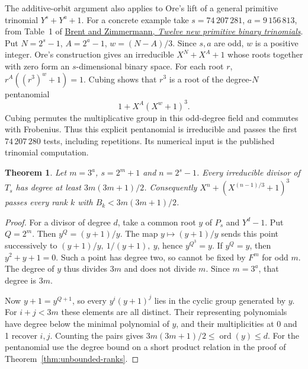 \documentclass[11pt]{article}
\newtheorem{theorem}{Theorem}
\newcommand{\ord}{\operatorname{ord}}
\begin{document}
The additive-orbit argument also applies to Ore's lift of a general
primitive trinomial \(Y^s+Y^a+1\). For a concrete example take
\(s=74\,207\,281\), \(a=9\,156\,813\), from Table~1 of
\href{https://maths-people.anu.edu.au/~brent/pd/rpb266.pdf}
{Brent and Zimmermann, \emph{Twelve new primitive binary trinomials}}.
Put \(N=2^s-1\), \(A=2^a-1\), \(w=(N-A)/3\). Since \(s,a\) are
odd, \(w\) is a positive integer. Ore's construction gives an
irreducible \(X^N+X^A+1\) whose roots together with zero form an
\(s\)-dimensional binary space. For each root \(r\),
\(r^A((r^3)^w+1)=1\). Cubing shows that \(r^3\) is a root of
the degree-\(N\) pentanomial
\[
                         1+X^A(X^w+1)^3.
\]
Cubing permutes the multiplicative group in this odd-degree field and
commutes with Frobenius. Thus this explicit pentanomial is irreducible
and passes the first \(74\,207\,280\) tests, including repetitions.
Its numerical input is the published trinomial computation.

\begin{theorem}\label{thm:factor-growth}
Let \(m=3^a\), \(s=2^m+1\) and \(n=2^s-1\). Every irreducible
divisor of \(T_s\) has degree at least \(3m(3m+1)/2\).
Consequently \(X^n+(X^{(n-1)/3}+1)^3\) passes every rank \(k\)
with \(B_k<3m(3m+1)/2\).
\end{theorem}
\begin{proof}
For a divisor of degree \(d\), take a common root \(y\) of \(P_s\)
and \(Y^d-1\). Put \(Q=2^m\). Then \(y^Q=(y+1)/y\).
The map \(y\mapsto(y+1)/y\) sends this point successively to
\((y+1)/y,\ 1/(y+1),\ y\), hence \(y^{Q^3}=y\).
If \(y^Q=y\), then \(y^2+y+1=0\). Such a point has degree two,
so cannot be fixed by \(F^m\) for odd \(m\). The degree of \(y\)
thus divides \(3m\) and does not divide \(m\). Since \(m=3^a\),
that degree is \(3m\).

Now \(y+1=y^{Q+1}\), so every \(y^i(y+1)^j\) lies in the cyclic
group generated by \(y\). For \(i+j<3m\) these elements are all
distinct. Their representing polynomials have degree below the
minimal polynomial of \(y\), and their multiplicities at 0 and 1
recover \(i,j\). Counting the pairs gives \(3m(3m+1)/2\le\ord(y)\le d\).
For the pentanomial use the degree bound on a short product relation
in the proof of Theorem~\ref{thm:unbounded-ranks}.
\end{proof}
\end{document}
